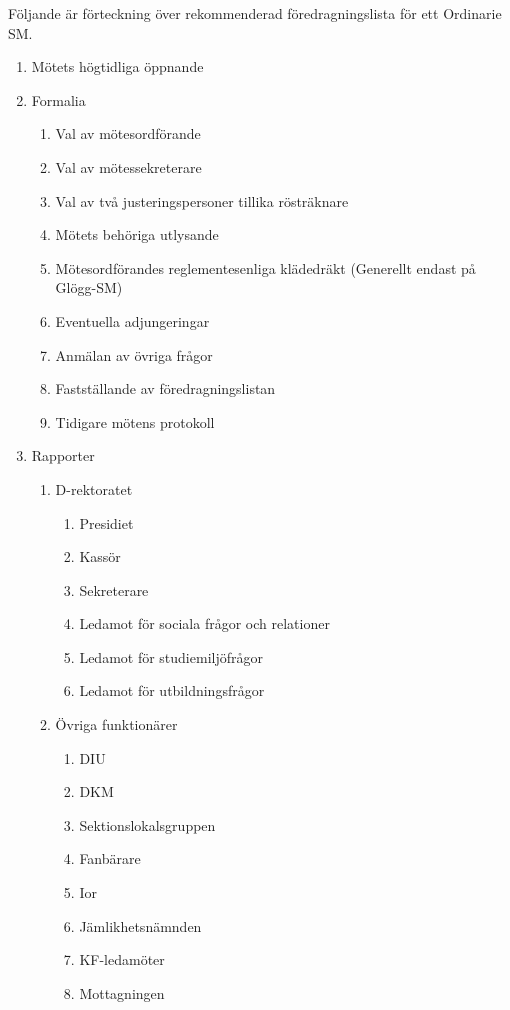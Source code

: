 \documentclass[a4paper,12pt]{article}
\begin{document}
Följande är förteckning över rekommenderad föredragningslista för ett Ordinarie SM.

\begin{enumerate}
  \item Mötets högtidliga öppnande
  \item Formalia
  \begin{enumerate}
      \item Val av mötesordförande
      \item Val av mötessekreterare
      \item Val av två justeringspersoner tillika rösträknare
      \item Mötets behöriga utlysande
      \item Mötesordförandes reglementesenliga klädedräkt (Generellt endast på Glögg-SM)
      \item Eventuella adjungeringar
      \item Anmälan av övriga frågor
      \item Fastställande av föredragningslistan
      \item Tidigare mötens protokoll
  \end{enumerate}
  \item Rapporter
  \begin{enumerate}
      \item D-rektoratet
      \begin{enumerate}
          \item Presidiet
          \item Kassör
          \item Sekreterare
          \item Ledamot för sociala frågor och relationer
          \item Ledamot för studiemiljöfrågor
          \item Ledamot för utbildningsfrågor
      \end{enumerate}
      \item Övriga funktionärer
      \begin{enumerate}
          \item DIU
          \item DKM
          \item Sektionslokalsgruppen
          \item Fanbärare
          \item Ior
          \item Jämlikhetsnämnden
          \item KF-ledamöter
          \item Mottagningen

\end{enumerate}
\end{enumerate}
\end{enumerate}
\end{document}

